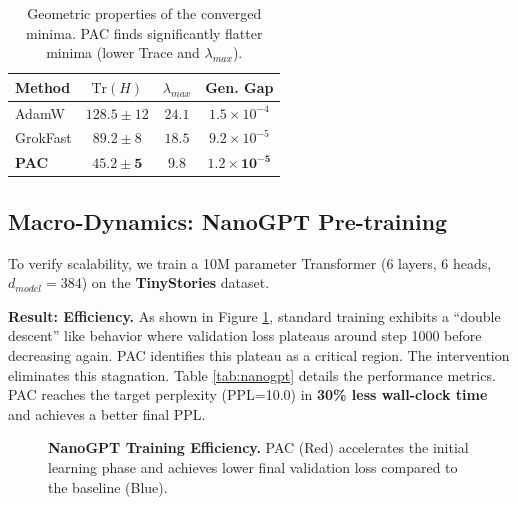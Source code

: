 \documentclass{article}
\theoremstyle{plain}
\theoremstyle{definition}
\theoremstyle{remark}
\newcommand{\trace}{\text{Tr}}
\begin{document}
\begin{table}[h]
\caption{Geometric properties of the converged minima. PAC finds significantly flatter minima (lower Trace and $\lambda_{max}$).}
\label{tab:geometry}
\begin{center}
\begin{small}
\begin{sc}
\begin{tabular}{lccc}
\toprule
Method & $\trace(H)$ & $\lambda_{max}$ & Gen. Gap \\
\midrule
AdamW & $128.5 \pm 12$ & $24.1$ & $1.5 \times 10^{-4}$ \\
GrokFast & $89.2 \pm 8$ & $18.5$ & $9.2 \times 10^{-5}$ \\
\textbf{PAC} & $\mathbf{45.2 \pm 5}$ & $\mathbf{9.8}$ & $\mathbf{1.2 \times 10^{-5}}$ \\
\bottomrule
\end{tabular}
\end{sc}
\end{small}
\end{center}
\end{table}

\subsection{Macro-Dynamics: NanoGPT Pre-training}
\label{subsec:nanogpt}

To verify scalability, we train a 10M parameter Transformer (6 layers, 6 heads, $d_{model}=384$) on the \textbf{TinyStories} dataset.

\textbf{Result: Efficiency.}
As shown in Figure \ref{fig:tinystories}, standard training exhibits a ``double descent'' like behavior where validation loss plateaus around step 1000 before decreasing again. PAC identifies this plateau as a critical region. The intervention eliminates this stagnation.
Table \ref{tab:nanogpt} details the performance metrics. PAC reaches the target perplexity (PPL=10.0) in \textbf{30\% less wall-clock time} and achieves a better final PPL.

\begin{figure}[ht]
\vskip 0.2in
\begin{center}
\centerline{\fbox{\rule{0pt}{1.8in} \rule{0.9\columnwidth}{0pt}}} 
\caption{\textbf{NanoGPT Training Efficiency.} PAC (Red) accelerates the initial learning phase and achieves lower final validation loss compared to the baseline (Blue).}
\label{fig:tinystories}
\end{center}
\vskip -0.2in
\end{figure}
\end{document}
